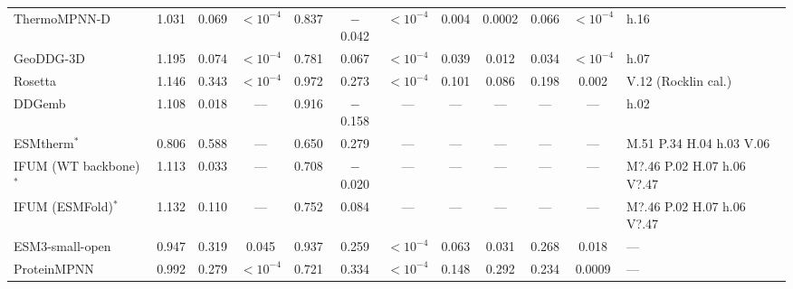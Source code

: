 \begin{table}[H]
{\begin{tabular}{lccccccccccl}
ThermoMPNN-D & 1.031 & 0.069 & $<10^{-4}$ & 0.837 & $-$0.042 & $<10^{-4}$ & 0.004 & 0.0002 & 0.066 & $<10^{-4}$ & h.16 \\
GeoDDG-3D & 1.195 & 0.074 & $<10^{-4}$ & 0.781 & 0.067 & $<10^{-4}$ & 0.039 & 0.012 & 0.034 & $<10^{-4}$ & h.07 \\
Rosetta & 1.146 & 0.343 & $<10^{-4}$ & 0.972 & 0.273 & $<10^{-4}$ & 0.101 & 0.086 & 0.198 & 0.002 & V.12 (Rocklin cal.) \\
DDGemb & 1.108 & 0.018 & --- & 0.916 & $-$0.158 & --- & --- & --- & --- & --- & h.02 \\
ESMtherm$^*$ & 0.806 & 0.588 & --- & 0.650 & 0.279 & --- & --- & --- & --- & --- & M.51 P.34 H.04 h.03 V.06 \\
IFUM (WT backbone)$^*$ & 1.113 & 0.033 & --- & 0.708 & $-$0.020 & --- & --- & --- & --- & --- & M?.46 P.02 H.07 h.06 V?.47 \\
IFUM (ESMFold)$^*$ & 1.132 & 0.110 & --- & 0.752 & 0.084 & --- & --- & --- & --- & --- & M?.46 P.02 H.07 h.06 V?.47 \\
ESM3-small-open & 0.947 & 0.319 & 0.045 & 0.937 & 0.259 & $<10^{-4}$ & 0.063 & 0.031 & 0.268 & 0.018 & --- \\
ProteinMPNN & 0.992 & 0.279 & $<10^{-4}$ & 0.721 & 0.334 & $<10^{-4}$ & 0.148 & 0.292 & 0.234 & 0.0009 & --- \\
\bottomrule
\end{tabular}
}
\end{table}
